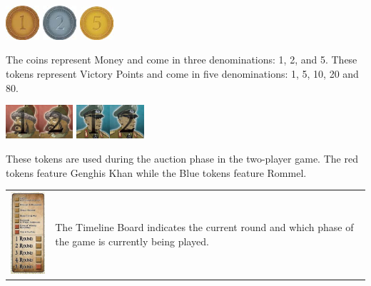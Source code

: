 \documentclass[10pt,twocolumn]{article}
\begin{document}
\centerline{\includegraphics[width=1.25cm]{1Money}  \includegraphics[width=1.25cm]{2Money}  \includegraphics[width=1.25cm]{5Money}}
The coins represent Money and come in three denominations: 1, 2, and 5.
These tokens represent Victory Points and come in five denominations: 1, 5, 10, 20 and 80.
\centerline{\includegraphics[height=1.25cm]{AT1}\includegraphics[height=1.25cm]{AT2}  \includegraphics[height=1.25cm]{AT3}\includegraphics[height=1.25cm]{AT4}}
These tokens are used during the auction phase in the two-player game. The red tokens feature Genghis Khan while the Blue tokens feature Rommel.
\begin{tabular}{p{2cm} p{5cm}}
	\vspace{0pt}
	\includegraphics[width=2cm]{TimelineBoard}
	&
	\vspace{0pt}
The Timeline Board indicates the current round and which phase of the game is currently being played.
\end{tabular}
\end{document}
